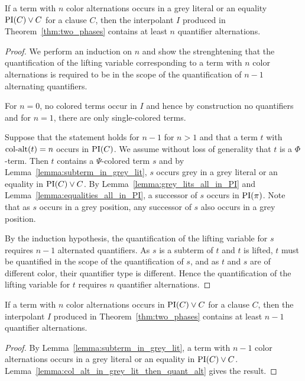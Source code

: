 \documentclass[,%
	draft=false,%
	numbers=noendperiod
	12pt,
	a4paper,
	oneside,%
	openany,
]{memoir}
\begin{document}
\begin{lemma}
	\label{lemma:col_alt_in_grey_lit_then_quant_alt}
	If a term with $n$ color alternations occurs in a grey literal or an equality $\operatorname{PI}(C) \lor C$ for a clause $C$, then the interpolant $I$ produced in Theorem~\ref{thm:two_phases} contains at least $n$ quantifier alternations.
\end{lemma}
\begin{proof}
	We perform an induction on $n$
	and show the strenghtening that
	the quantification of the lifting variable corresponding to a term with $n$ color alternations is required to be in the scope of the quantification of $n-1$ alternating quantifiers.

	For $n=0$, no colored terms occur in $I$ and hence by construction no quantifiers
	and for $n=1$, there are only single-colored terms.

	Suppose that the statement holds for $n-1$ for $n>1$ and that a term $t$ with $\operatorname{col-alt}(t) = n$ occurs in $\operatorname{PI}(C)$.
	We assume without loss of generality that $t$ is a $\Phi$-term.
	Then $t$ contains a $\Psi$-colored term $s$ and
	by Lemma~\ref{lemma:subterm_in_grey_lit}, $s$ occurs grey in a grey literal or an equality in $\operatorname{PI}(C) \lor C$.
	By Lemma~\ref{lemma:grey_lits_all_in_PI} and Lemma~\ref{lemma:equalities_all_in_PI}, a successor of $s$ occurs in $\operatorname{PI}(\pi)$. Note that as $s$ occurs in a grey position, any successor of $s$ also occurs in a grey position.

	By the induction hypothesis, the quantification of the lifting variable for $s$ requires $n-1$ alternated quantifiers.
	As $s$ is a subterm of $t$ and $t$ is lifted, $t$ must be quantified in the scope of the quantification of $s$, and as $t$ and $s$ are of different color, their quantifier type is different. 
	Hence the quantification of the lifting variable for $t$ requires $n$ quantifier alternations.
\end{proof}

\begin{prop}
	\label{prop:color_alt_eq_quant_alt}
	If a term with $n$ color alternations occurs in $\operatorname{PI}(C) \lor C$ for a clause $C$, then the interpolant $I$ produced in Theorem~\ref{thm:two_phases} contains at least $n-1$ quantifier alternations.
\end{prop}
\begin{proof}
	By Lemma~\ref{lemma:subterm_in_grey_lit}, a term with $n-1$ color alternations occurs in a grey literal or an equality in $\operatorname{PI}(C) \lor C$.
	Lemma~\ref{lemma:col_alt_in_grey_lit_then_quant_alt} gives the result.
\end{proof}
\end{document}
